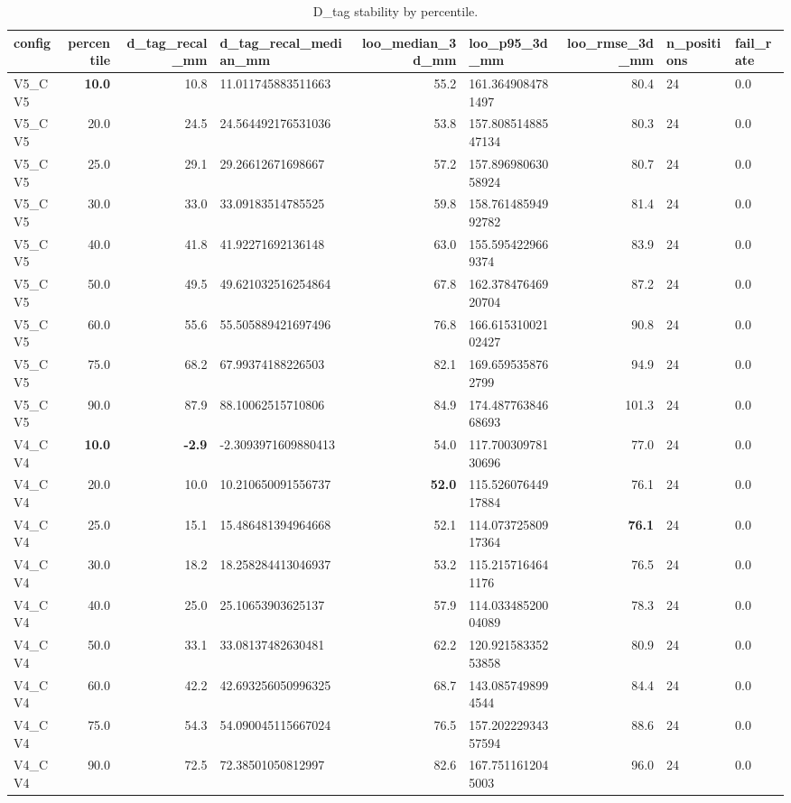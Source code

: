 \begin{table}[t]
\centering
\caption{D_tag stability by percentile.}
\label{tab:dtag_stability}
\begin{tabular}{lrrlrlrll}
\hline
config & percentile & d\_tag\_recal\_mm & d\_tag\_recal\_median\_mm & loo\_median\_3d\_mm & loo\_p95\_3d\_mm & loo\_rmse\_3d\_mm & n\_positions & fail\_rate \\
\hline
V5\_CV5 & \textbf{10.0} & 10.8 & 11.011745883511663 & 55.2 & 161.3649084781497 & 80.4 & 24 & 0.0 \\
V5\_CV5 & 20.0 & 24.5 & 24.564492176531036 & 53.8 & 157.80851488547134 & 80.3 & 24 & 0.0 \\
V5\_CV5 & 25.0 & 29.1 & 29.26612671698667 & 57.2 & 157.89698063058924 & 80.7 & 24 & 0.0 \\
V5\_CV5 & 30.0 & 33.0 & 33.09183514785525 & 59.8 & 158.76148594992782 & 81.4 & 24 & 0.0 \\
V5\_CV5 & 40.0 & 41.8 & 41.92271692136148 & 63.0 & 155.5954229669374 & 83.9 & 24 & 0.0 \\
V5\_CV5 & 50.0 & 49.5 & 49.621032516254864 & 67.8 & 162.37847646920704 & 87.2 & 24 & 0.0 \\
V5\_CV5 & 60.0 & 55.6 & 55.505889421697496 & 76.8 & 166.61531002102427 & 90.8 & 24 & 0.0 \\
V5\_CV5 & 75.0 & 68.2 & 67.99374188226503 & 82.1 & 169.6595358762799 & 94.9 & 24 & 0.0 \\
V5\_CV5 & 90.0 & 87.9 & 88.10062515710806 & 84.9 & 174.48776384668693 & 101.3 & 24 & 0.0 \\
V4\_CV4 & \textbf{10.0} & \textbf{-2.9} & -2.3093971609880413 & 54.0 & 117.70030978130696 & 77.0 & 24 & 0.0 \\
V4\_CV4 & 20.0 & 10.0 & 10.210650091556737 & \textbf{52.0} & 115.52607644917884 & 76.1 & 24 & 0.0 \\
V4\_CV4 & 25.0 & 15.1 & 15.486481394964668 & 52.1 & 114.07372580917364 & \textbf{76.1} & 24 & 0.0 \\
V4\_CV4 & 30.0 & 18.2 & 18.258284413046937 & 53.2 & 115.2157164641176 & 76.5 & 24 & 0.0 \\
V4\_CV4 & 40.0 & 25.0 & 25.10653903625137 & 57.9 & 114.03348520004089 & 78.3 & 24 & 0.0 \\
V4\_CV4 & 50.0 & 33.1 & 33.08137482630481 & 62.2 & 120.92158335253858 & 80.9 & 24 & 0.0 \\
V4\_CV4 & 60.0 & 42.2 & 42.693256050996325 & 68.7 & 143.0857498994544 & 84.4 & 24 & 0.0 \\
V4\_CV4 & 75.0 & 54.3 & 54.090045115667024 & 76.5 & 157.20222934357594 & 88.6 & 24 & 0.0 \\
V4\_CV4 & 90.0 & 72.5 & 72.38501050812997 & 82.6 & 167.7511612045003 & 96.0 & 24 & 0.0 \\
\hline
\end{tabular}
\end{table}
